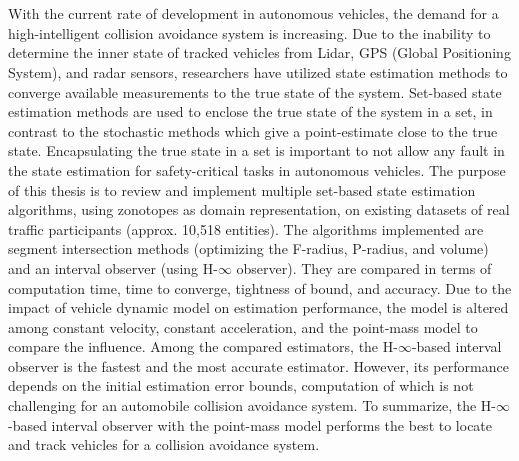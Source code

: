 \chapter{\abstractname}
With the current rate of development in autonomous vehicles, the demand for a high-intelligent collision avoidance system is increasing. Due to the inability to determine the inner state of tracked vehicles from Lidar, GPS (Global Positioning System), and radar sensors, researchers have utilized state estimation methods to converge available measurements to the true state of the system. Set-based state estimation methods are used to enclose the true state of the system in a set, in contrast to the stochastic methods which give a point-estimate close to the true state. Encapsulating the true state in a set is important to not allow any fault in the state estimation for safety-critical tasks in autonomous vehicles. The purpose of this thesis is to review and implement multiple set-based state estimation algorithms, using zonotopes as domain representation, on existing datasets of real traffic participants (approx. 10,518 entities). The algorithms implemented are segment intersection methods (optimizing the F-radius, P-radius, and volume) and an interval observer (using H-$\infty$ observer). They are compared in terms of computation time, time to converge, tightness of bound, and accuracy. Due to the impact of vehicle dynamic model on estimation performance, the model is altered among constant velocity, constant acceleration, and the point-mass model to compare the influence. Among the compared estimators, the H-$\infty$-based interval observer is the fastest and the most accurate estimator. However, its performance depends on the initial estimation error bounds, computation of which is not challenging for an automobile collision avoidance system. To summarize, the H-$\infty$-based interval observer with the point-mass model performs the best to locate and track vehicles for a collision avoidance system.